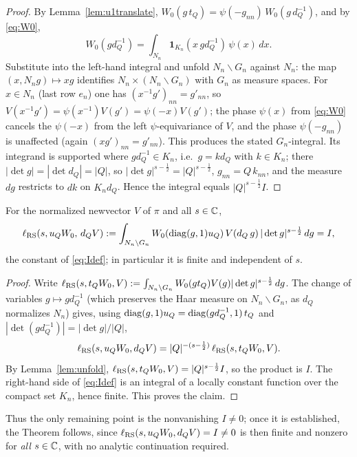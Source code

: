 \begin{proof}
By Lemma~\ref{lem:u1translate}, $W_0(g\,t_Q)=\psi(-g_{nn})\,W_0(g\,d_Q^{-1})$, and by
\eqref{eq:W0},
\[
W_0(g d_Q^{-1})=\int_{N_n}\mathbf 1_{K_n}(x\,g d_Q^{-1})\,\psi(x)\,dx .
\]
Substitute into the left-hand integral and unfold $N_n\backslash G_n$ against $N_n$: the map
$(x,N_n g)\mapsto xg$ identifies $N_n\times(N_n\backslash G_n)$ with $G_n$ as measure spaces.
For $x\in N_n$ \textup{(}last row $e_n$\textup{)} one has $(x^{-1}g')_{nn}=g'_{nn}$, so
$V(x^{-1}g')=\psi(x^{-1})V(g')=\psi(-x)V(g')$; the phase $\psi(x)$ from \eqref{eq:W0} cancels the
$\psi(-x)$ from the left $\psi$-equivariance of $V$, and the phase $\psi(-g_{nn})$ is unaffected
\textup{(}again $(xg')_{nn}=g'_{nn}$\textup{)}. This produces the stated $G_n$-integral. Its
integrand is supported where $g d_Q^{-1}\in K_n$, i.e.\ $g=k d_Q$ with $k\in K_n$; there
$|\det g|=|\det d_Q|=|Q|$, so $|\det g|^{s-\frac12}=|Q|^{s-\frac12}$, $g_{nn}=Q\,k_{nn}$, and the
measure $dg$ restricts to $dk$ on $K_n d_Q$. Hence the integral equals $|Q|^{s-\frac12}I$.
\end{proof}

\begin{qtwocorollary}\label{cor:sindep}
For the normalized newvector $V$ of $\pi$ and all $s\in\mathbb{C}$,
\[
\ell_{\mathrm{RS}}(s,u_Q W_0,\,d_Q V)
:=\int_{N_n\backslash G_n}W_0(\operatorname{diag}(g,1)u_Q)\,V(d_Q\, g)\,|\det g|^{s-\frac12}\,dg = I ,
\]
the constant of \eqref{eq:Idef}; in particular it is finite and independent of $s$.
\end{qtwocorollary}

\begin{proof}
Write $\ell_{\mathrm{RS}}(s,t_Q W_0,V):=\int_{N_n\backslash G_n}W_0(g t_Q)V(g)|\det g|^{s-\frac12}\,dg$.
The change of variables $g\mapsto g d_Q^{-1}$ \textup{(}which preserves the Haar measure on
$N_n\backslash G_n$, as $d_Q$ normalizes $N_n$\textup{)} gives, using
$\operatorname{diag}(g,1)u_Q=\operatorname{diag}(g d_Q^{-1},1)\,t_Q$ and $|\det(g d_Q^{-1})|=|\det g|/|Q|$,
\[
\ell_{\mathrm{RS}}(s,u_Q W_0,d_Q V)=|Q|^{-(s-\frac12)}\,\ell_{\mathrm{RS}}(s,t_Q W_0,V).
\]
By Lemma~\ref{lem:unfold}, $\ell_{\mathrm{RS}}(s,t_Q W_0,V)=|Q|^{s-\frac12}I$, so the product is $I$.
The right-hand side of \eqref{eq:Idef} is an integral of a locally constant function over the
compact set $K_n$, hence finite. This proves the claim.
\end{proof}

\noindent Thus the only remaining point is the nonvanishing $I\neq0$; once it is established, the
Theorem follows, since $\ell_{\mathrm{RS}}(s,u_Q W_0,d_Q V)=I\neq0$ is then finite and nonzero for
\emph{all} $s\in\mathbb{C}$, with no analytic continuation required.

